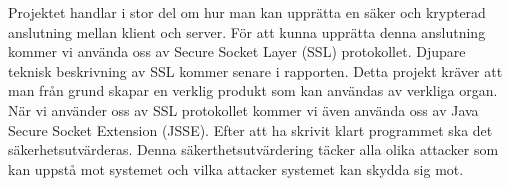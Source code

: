 Projektet handlar i stor del om hur man kan upprätta en säker och krypterad anslutning mellan klient och server. För att kunna upprätta denna anslutning kommer vi använda oss av Secure Socket Layer (SSL) protokollet. Djupare teknisk beskrivning av SSL kommer senare i rapporten. Detta projekt kräver att man från grund skapar en verklig produkt som kan användas av verkliga organ. När vi använder oss av SSL protokollet kommer vi även använda oss av Java Secure Socket Extension (JSSE). Efter att ha skrivit klart programmet ska det säkerhetsutvärderas. Denna säkerthetsutvärdering täcker alla olika attacker som kan uppstå mot systemet och vilka attacker systemet kan skydda sig mot. 